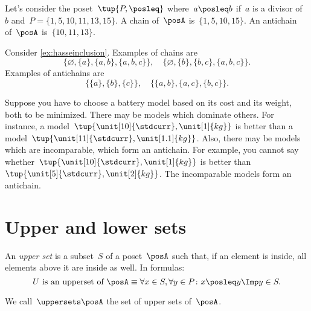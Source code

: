 \begin{example}
  Let's consider the poset~$\tup{P,\posleq}$ where~$a\posleq b$ if~$a$ is a divisor of~$b$ and~$P=\{1,5,10,11,13,15\}$. A chain of~$\posA$ is~$\{1,5,10,15\}$. An antichain of~$\posA$ is~$\{10,11,13\}$.
\end{example}

\begin{example}
  Consider \cref{ex:hasseinclusion}. Examples of chains are
  \begin{equation}
    \{\varnothing,\{a\},\{a,b\},\{a,b,c\}\}, \quad  \{\varnothing,\{b\},\{b,c\},\{a,b,c\}\}.
  \end{equation}
  Examples of antichains are
  \begin{equation}
    \{\{a\},\{b\},\{c\}\}, \quad \{ \{a,b\},\{a,c\}, \{b,c\}\}.
  \end{equation}
\end{example}

\begin{example}
  \label{ex:battery}
  Suppose you have to choose a battery model based on its cost and its weight, both to be minimized.
  There may be models which dominate others.
  For instance, a model~$\tup{\unit[10]{\stdcurr},\unit[1]{kg}}$ is better than a model~$\tup{\unit[11]{\stdcurr},\unit[1.1]{kg}}$.
  Also, there may be models which are incomparable, which form an antichain.
  For example, you cannot say whether~$\tup{\unit[10]{\stdcurr},\unit[1]{kg}}$ is better than~$\tup{\unit[5]{\stdcurr},\unit[2]{kg}}$. The incomparable models form an antichain.
\end{example}


\section{Upper and lower sets}

\begin{definition}
  \label{def:upperset}
  An \emph{upper set} is a subset~$S$ of a poset~$\posA$ such
  that, if an element is inside, all elements above it are inside as well.
  In formulas:
  \begin{equation}
    \text{$U$ is an upperset of $\posA$} \equiv \forall x\in S, \forall y\in P\colon x\posleq y \Imp y\in S.
  \end{equation}
\end{definition}
\begin{remark}
  We call~$\uppersets \posA$ the set of upper sets of~$\posA$.
\end{remark}

